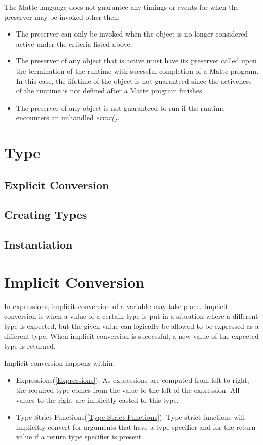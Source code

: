 \documentclass[12pt,letterpaper]{report}
\begin{document}
The Matte language does not guarantee any timings or events for when the preserver may be invoked other 
then: 

\begin{itemize}
  \item The preserver can only be invoked when the object is no longer considered active under the criteria listed above.
  \item The preserver of any object that is active must have its preserver called upon the termination of the runtime with sucessful completion of a Matte program. In this case, the lifetime of the object is not guaranteed since the activeness of the runtime is not defined after a Matte program finishes.
  \item The preserver of any object is not guaranteed to run if the runtime encounters an unhandled \textit{error()}.
\end{itemize}







\section{Type}\label{Type}
\subsection{Explicit Conversion}\label{Explicit Conversion}
\subsection{Creating Types}\label{Creating Types}
\subsection{Instantiation}\label{Instantiation}
\section{Implicit Conversion}\label{Implicit Conversion}

In expressions, implicit conversion of a variable may take place. Implicit conversion is when 
a value of a certain type is put in a situation where a different type is expected, but the 
given value can logically be allowed to be expressed as a different type. When implicit 
conversion is successful, a new value of the expected type is returned.

Implicit conversion happens within:
\begin{itemize}
  \item Expressions(\autoref{Expressions}). As expressions are computed from left to right, the required type comes from the value to the left of the expression. All values to the right are implicitly casted to this type.
  \item Type-Strict Functions(\autoref{Type-Strict Functions}). Type-strict functions will implicitly convert for arguments that have a type specifier and for the return value if a return type specifier is present.
\end{itemize}
\end{document}
